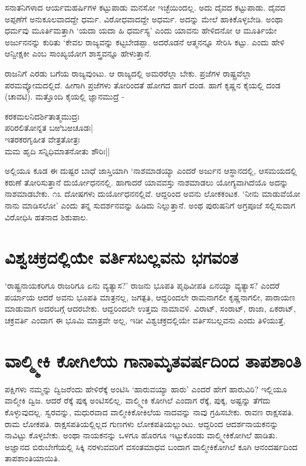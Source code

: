 ಸನಾತನಿಗಳಾದ ಆರ್ಯಮಹರ್ಷಿಗಳ ಕಟ್ಟುಪಾಡು ಮನಸೋ ಇಚ್ಛೆಯಿಂದಲ್ಲ. ಅದು ದೈವದ ಕಟ್ಟುಪಾಡು. ದೈವದ ಅಪ್ಪಣೆಗೆ ಅನುಕೂಲವಾದದ್ದೇ ಧರ್ಮ. ವಿರೋಧವಾದದ್ದೇ ಅಧರ್ಮ. ಅದನ್ನು ಮೇಲೆ ಹಾಕಿಕೊಳ್ಳಬೇಡಿ. ಅಂಥಾ ಧರ್ಮವು ಮೂರ್ತಿಮತ್ತಾಗಿ `ಯದಾ ಯದಾ ಹಿ ಧರ್ಮಸ್ಯ' ಎಂದು ಯಾವನು ಹೇಳಿದನೋ ಆ ಮೂರ್ತಿಯೇ ಅರ್ಜುನನನ್ನು ಕುರಿತು `ಕೇವಲ ರಾಜ್ಯವನ್ನು ಕಟ್ಟಬೇಡಪ್ಪಾ. ಅದರೊಡನೆ ಆತ್ಮನನ್ನೂ ಸೇರಿಸಿ ಕಟ್ಟು. ಎಂದು ಹೇಳಿ ಆನ್ವೀಕ್ಷಕೀ ಎಂಬ ಸಾಂಖ್ಯಯೋಗ ಶಾಸ್ತ್ರವನ್ನೂ ಹೇಳುತ್ತಾನೆ.

ರಾಜನಿಗೆ ಎರಡು ಬಗೆಯ ರಾಜ್ಯವುಂಟು. ಆ ರಾಜ್ಯದಲ್ಲಿ ಅಮರರೆಲ್ಲಾ ಬೇಕು. ಪ್ರಜೆಗಳ ರಾಷ್ಟ್ರವೆಲ್ಲಾ ಪರಮವ್ಯೋಮದಲ್ಲಿದೆ. ಹೀಗಾಗಿ ಪ್ರಜೆಗಳು ತೋರಿಂದತೆ ಹೋಗದ ಹಾಗೆ ದಂಡ. ಹಾಗೆ ಕೃಷ್ಣನ ಕೈಯಲ್ಲಿ ದಂಡ (ಚಾವಟಿ). ಮತ್ತೊಂದಿ ಕೈಯಲ್ಲಿ ಜ್ಞಾನಮುದ್ರೆ -

\begin{shloka}
ಕರಕಮಲನಿದರ್ಶಿತಾತ್ಮಮುದ್ರಃ\\
ಪರಿರಲಿತೋನ್ನತ ಬಱಿಬಱಚೂಡಃ|\\
ಇತರಕರಗೃಹೀತ ವೇತ್ರತೋತ್ರಃ\\
ಮಮ ಹೃದಿ ಸನ್ನಿಧಿಮಾತನೋತು ಶೌರಿಃ||
\end{shloka}

ಅಲ್ಲಿಯೂ ಕೂಡ ಈ ದುಷ್ಟರ ಬಾಧೆ ಜಾಸ್ತಿಯಾಗಿ `ನಾಶಮಾಡಯ್ಯಾ ಎಂದರೆ ಅರ್ಜುನ ಆಸ್ಥಾನದಲ್ಲಿ, ಆಸಮಯದಲ್ಲಿ ಕರುಣೆ ತೋರಿಸುತ್ತಾನೆ ದುರ್ಯೋಧನನಲ್ಲಿ. ಹಾಗಾದರೆ ಯಾವವಸ್ತು ನಾಶಮಾಡಲು ಯೋಗ್ಯವಾಗಿದೆಯೊ ಅದನ್ನು ನಾಶಮಾಡಬೇಕು. ೧೩ ದೋಷಗಳು ದುರ್ಯೋಧನನಲ್ಲಿವೆ. ಆದ್ದರಿಂದ ಅವನು ಲೋಕಕಂಟಕ. `ನೀನು ಮಾಡುವೆಯೋ ನಾನು ಮಾಡಿಸಲೋ' ಎಂದು ತನ್ನ ಸುದರ್ಶನವನ್ನು ಹಿಡಿದು ನಿಲ್ಲುತ್ತಾನೆ. ಅಂಥ ಪುರುಷನಿಗೆ ಅಗ್ರಪೂಜೆ ಸಲ್ಲಿಸುವಾಗ ವಿರೋಧಿಸಿ ಹತನಾದ ಶಿಶುಪಾಲ. 

\section*{ವಿಶ್ವಚಕ್ರದಲ್ಲಿಯೇ ವರ್ತಿಸಬಲ್ಲವನು ಭಗವಂತ}

`ರಾಷ್ಟ್ರನಾಯಕರಿಗೂ ರಾಜರಿಗೂ ಏನು ವ್ಯತ್ಯಾಸ?' ರಾಜನು ಭೂಪತಿ ಪೃಥಿವೀಪತಿ ಏನಯ್ಯಾ ವ್ಯತ್ಯಾಸ? ಎಂದರೆ ಪರ್ಯಾಯ ಆದರೆ ಅವನು ಭೂಪತಿ ಮಾತ್ರನಲ್ಲ, ಜಗತ್ಪತಿ, ಆದ್ದರಿಂದಲೇ ರಾಮನಾಗಲೀ ಕೃಷ್ಣನಾಗಲೀ, ಪಾರಾಯಣ ಮಾಡುವಾಗ ಅದರಬಗ್ಗೆ ಆದರಬೇಕು. ಆದ್ದರಿಂದಲೇ ಉತ್ತಮ ನಾಮಾವಳಿ. ವಿರಾಟ್, ಸಂರಾಟ್, ರಾಜಾ, ಏಕರಾಟ್, ಚಕ್ರವರ್ತಿ ಎಂದಾಗ ಈ ಭೂಮಿ ಮಾತ್ರವೇ ಅಲ್ಲ, ಇಡೀ ವಿಶ್ವಚಕ್ರದಲ್ಲಿಯೇ ವರ್ತಿಸಬಲ್ಲವನು ಎಂದು ತಿಳಿಯುತ್ತೆ. 

\section*{ವಾಲ್ಮ್ಮೀಕಿ ಕೋಗಿಲೆಯ ಗಾನಾಮೃತವರ್ಷದಿಂದ ತಾಪಶಾಂತಿ}

ಪಕ್ಷಿಗಳು ನಮ್ಮನ್ನು ದ್ವಿಜರೆಂದು ಹೇಳಿರೆಕ್ಕೆ ಅಂಟಿಸಿ `ಹಾರುವಯ್ಯಾ ಹಾರು' ಎಂದರೆ ಹೇಗೆ ಹಾರುವಿರಿ? ಇಲ್ಲಿಯೂ ವಾಲ್ಮೀಕಿ ದ್ವಿಜ. ಆದರೆ ರೆಕ್ಕೆ ಪುಕ್ಕ ಅಂಟಿಸಲಿಲ್ಲ. ವಾಲ್ಮ್ಮೀಕಿ ಕೋಗಿಲೆ ಎಂದಾಗ ರೆಕ್ಕೆ, ಪುಕ್ಕ, ಅಷ್ಟನ್ನು ತೆಗೆದು ಕೊಳ್ಳುವುದಲ್ಲ. ಸ್ವರವನ್ನು, ಮಧುರವಾದ ವಾಲ್ಮೀಕಿಕೋಕಿಲೆಯ ನಾದವನ್ನು ನಾವು ಗ್ರಹಿಸಬೇಕು. ರಾವಣ ರಾಕ್ಷಸಪತಿ. ರಾಮ ಲೋಕಪತಿ. ರಾಕ್ಷಸಪತಿಯಲ್ಲಿಲ್ಲದ ಗುಣಗಳು ಲೋಕಪತಿಯಲ್ಲುಂಟು. ಆದ್ದರಿಂದ ಆದರ್ಶನಾಯಕನನ್ನು ನಾವಿಟ್ಟು ಕೊಳ್ಳಬೇಕು. ಅಂಥಾ‌ ನಾಯಕನನ್ನು ಒಳಗೂ ಹೊರಗೂ ಇಟ್ಟುಕೊಂಡು ವಾಲ್ಮ್ಮೀಕಿಕೋಗಿಲೆ ಹಾಡಿತು. ಅಜ್ಞಾನದ ಬಿರುಬೇಗೆಯಲ್ಲಿ ಸಿಕ್ಕಿ ನರಳುವವರಿಗೆ ವಸಂತಮಾಧವ ಬಂದಾಗ ವಾಲ್ಮೀಕಿಕೋಗಿಲೆ ಕೂಗಿ ಆನಂದರ್ಷದಿಂದ ತಾಪಶಾಂತಿಯಾಯಿತಿ.

